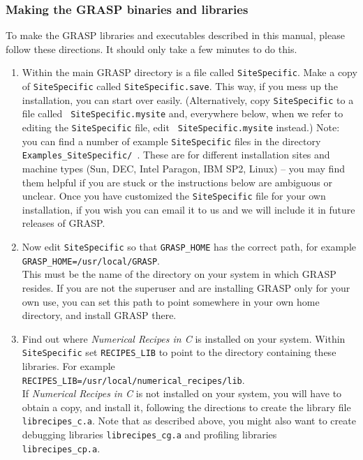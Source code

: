 \subsubsection{Making the GRASP binaries and libraries}
\label{ss:buildit}
To make the GRASP libraries and executables described in this manual,
please follow these directions.  It should only take a few minutes to
do this.
\begin{enumerate}
\item
Within the main GRASP directory is a file called {\tt SiteSpecific}.
Make a copy of {\tt SiteSpecific} called {\tt SiteSpecific.save}.  This
way, if you mess up the installation, you can start over easily.
(Alternatively, copy {\tt SiteSpecific} to a file called {\tt
SiteSpecific.mysite} and, everywhere below, when we refer to editing
the {\tt SiteSpecific} file, edit {\tt
SiteSpecific.mysite} instead.)  Note: you can find a number of example
{\tt SiteSpecific} files in the directory {\tt
Examples\_SiteSpecific/ }.
These are for different installation sites and machine types (Sun,
DEC, Intel Paragon, IBM SP2, Linux) -- you
may find them helpful if you are stuck or the instructions below are
ambiguous or unclear.  Once you have customized the {\tt SiteSpecific}
file for your own installation, if you wish you can email it to
us and we will include it in future releases of GRASP.
\item
Now edit {\tt SiteSpecific} so that {\tt GRASP\_HOME} has the correct
path, for example \\ 
\mbox{\tt GRASP\_HOME=/usr/local/GRASP}.\\  
This must be the
name of the directory on your system in which GRASP resides.  If you
are not the superuser and are installing GRASP only for your own use,
you can set this path to point somewhere in your own home directory,
and install GRASP there.
\item
Find out where {\it Numerical Recipes in C} is installed on your
system.  Within {\tt SiteSpecific} set {\tt RECIPES\_LIB} to point to
the directory containing these libraries.  For example\\
\mbox{\tt RECIPES\_LIB=/usr/local/numerical\_recipes/lib}.\\  If {\it Numerical
Recipes in C} is not installed on your system, you will have to obtain
a copy, and install it, following the directions to create the library
file {\tt librecipes\_c.a}.  Note that as described above, you might
also want to create debugging libraries {\tt librecipes\_cg.a} and
profiling libraries {\tt librecipes\_cp.a}.

\end{enumerate}
